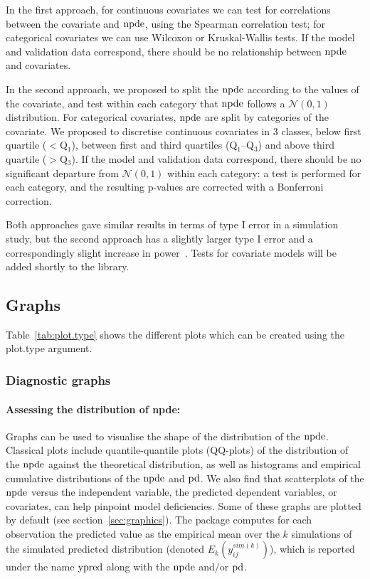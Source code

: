 In the first approach, for continuous covariates we can test for correlations between the covariate and ${\rm npde}$, using the Spearman correlation test; for categorical covariates we can use Wilcoxon or Kruskal-Wallis tests. If the model and validation data correspond, there should be no relationship between ${\rm npde}$ and covariates.

In the second approach, we proposed to split the ${\rm npde}$ according to the values of the covariate, and test within each category that ${\rm npde}$ follows a $\mathcal{N}(0,1)$ distribution. For categorical covariates, ${\rm npde}$ are split by categories of the covariate. We proposed to discretise continuous covariates in 3 classes, below first quartile ($<$Q$_1$), between first and third quartiles (Q$_1$--Q$_3$) and above third quartile ($>$Q$_3$). If the model and validation data correspond, there should be no significant departure from $\mathcal{N}(0,1)$ within each category: a test is performed for each category, and the resulting p-values are corrected with a Bonferroni correction.

Both approaches gave similar results in terms of type I error in a simulation study, but the second approach has a slightly larger type I error and a correspondingly slight increase in power~\cite{Brendel10}. Tests for covariate models will be added shortly to the library.

\subsection{Graphs} \label{sec:graphmethods}

Table~\ref{tab:plot.type} shows the different plots which can be created using the {\sf plot.type} argument.

\subsubsection{Diagnostic graphs} 

\paragraph{Assessing the distribution of npde:} Graphs can be used to visualise the shape of the distribution of the ${\rm npde}$. Classical plots include quantile-quantile plots (QQ-plots) of the distribution of the ${\rm npde}$ against the theoretical distribution, as well as  histograms and empirical cumulative distributions of the ${\rm npde}$ and ${\rm pd}$. We also find that scatterplots of the ${\rm npde}$ versus the independent variable, the predicted dependent variables, or covariates, can help pinpoint model deficiencies. Some of these graphs are plotted by default (see section~\ref{sec:graphics}). The package computes for each observation the predicted value as the empirical mean over the $k$ simulations of the simulated predicted distribution (denoted $E_k(y^{sim(k)}_{ij})$), which is reported under the name ${\rm ypred}$ along with the ${\rm npde}$ and/or ${\rm pd}$.

